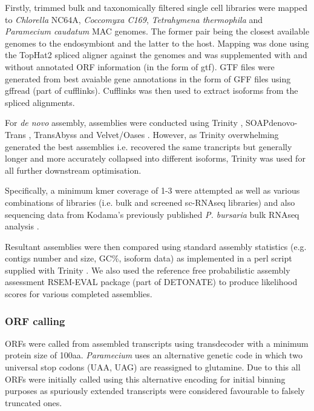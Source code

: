 Firstly, trimmed bulk and taxonomically filtered single cell libraries
were mapped to \textit{Chlorella} NC64A, \textit{Coccomyxa C169}, 
\textit{Tetrahymena thermophila} and \textit{Paramecium caudatum} MAC genomes.
The former pair being the closest available genomes to the endosymbiont and the latter to the host.
Mapping was done using the TopHat2 spliced aligner \citep{Kim2013} against
the genomes and was supplemented with and without annotated ORF information (in the form of gtf).
GTF files were generated from best avaiable gene annotations in the form of GFF files using gffread (part of
cufflinks).
Cufflinks \citep{Trapnell2011} was then used to extract isoforms from the spliced alignments.

For \textit{de novo} assembly, assemblies were conducted using Trinity \citep{Grabherr2011}, 
SOAPdenovo-Trans \citep{Xie2014}, TransAbyss \citep{Robertson2010} and Velvet/Oases \citep{Schulz2012}.
However, as Trinity overwhelming generated the best assemblies i.e. recovered the same trancripts
but generally longer and more accurately collapsed into different isoforms, Trinity was 
used for all further downstream optimisation.

Specifically, a minimum kmer coverage of 1-3 were attempted as well as various
combinations of libraries (i.e. bulk and screened sc-RNAseq libraries) and also
sequencing data from Kodama's previously published \textit{P. bursaria} bulk
RNAseq analysis \citep{Kodama2014c}.

Resultant assemblies were then compared using standard assembly statistics 
(e.g. contigs number and size, GC\%, isoform data) as implemented in a perl script supplied with 
Trinity \citep{Haas2013}.  We also used the reference
free probabilistic assembly assessment RSEM-EVAL package (part of DETONATE) \citep{Li2014} to
produce likelihood scores for various completed assemblies.


\subsubsection{ORF calling}

ORFs were called from assembled transcripts using transdecoder \citep{Haas2013} with 
a minimum protein size of 100aa.  \textit{Paramecium} uses an alternative
genetic code in which two universal stop codons (UAA, UAG) are reassigned to glutamine.
Due to this all ORFs were initially called using this alternative encoding for initial binning
purposes as spuriously extended transcripts were considered favourable to falsely truncated
ones. 

